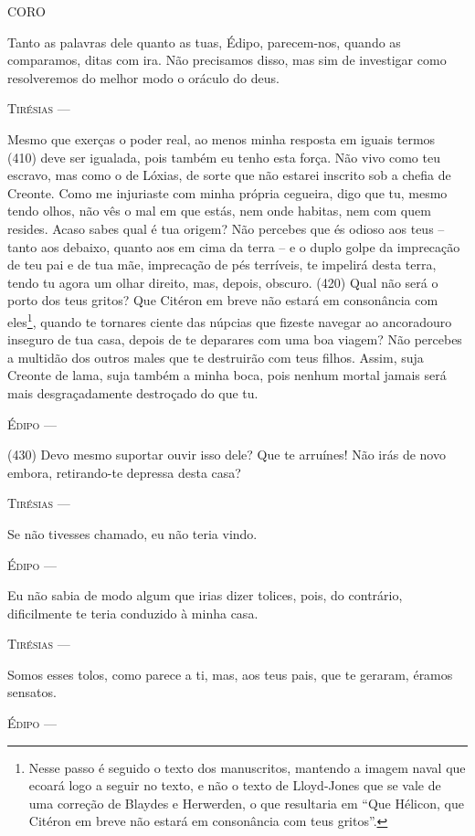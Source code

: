 \textsc{CORO}

Tanto as palavras dele quanto as tuas, Édipo, parecem-nos, quando as
comparamos, ditas com ira. Não precisamos disso, mas sim de investigar
como resolveremos do melhor modo o oráculo do deus.

\textsc{Tirésias} ---

Mesmo que exerças o poder real, ao menos minha resposta em iguais termos
(410) deve ser igualada, pois também eu tenho esta força. Não vivo como
teu escravo, mas como o de Lóxias, de sorte que não estarei inscrito sob
a chefia de Creonte. Como me injuriaste com minha própria cegueira, digo
que tu, mesmo tendo olhos, não vês o mal em que estás, nem onde habitas,
nem com quem resides. Acaso sabes qual é tua origem? Não percebes que és
odioso aos teus -- tanto aos debaixo, quanto aos em cima da terra -- e o
duplo golpe da imprecação de teu pai e de tua mãe, imprecação de pés
terríveis, te impelirá desta terra, tendo tu agora um olhar direito,
mas, depois, obscuro. (420) Qual não será o porto dos teus gritos? Que
Citéron em breve não estará em consonância com eles\footnote{Nesse passo
  é seguido o texto dos manuscritos, mantendo a imagem naval que ecoará
  logo a seguir no texto, e não o texto de Lloyd-Jones que se vale de
  uma correção de Blaydes e Herwerden, o que resultaria em ``Que
  Hélicon, que Citéron em breve não estará em consonância com teus
  gritos''.}, quando te tornares ciente das núpcias que fizeste navegar
ao ancoradouro inseguro de tua casa, depois de te deparares com uma boa
viagem? Não percebes a multidão dos outros males que te destruirão com
teus filhos. Assim, suja Creonte de lama, suja também a minha boca, pois
nenhum mortal jamais será mais desgraçadamente destroçado do que tu.

\textsc{Édipo} ---

(430) Devo mesmo suportar ouvir isso dele? Que te arruínes! Não irás de
novo embora, retirando-te depressa desta casa?

\textsc{Tirésias} ---

Se não tivesses chamado, eu não teria vindo.

\textsc{Édipo} ---

Eu não sabia de modo algum que irias dizer tolices, pois, do contrário,
dificilmente te teria conduzido à minha casa.

\textsc{Tirésias} ---

Somos esses tolos, como parece a ti, mas, aos teus pais, que te geraram,
éramos sensatos.

\textsc{Édipo} ---

